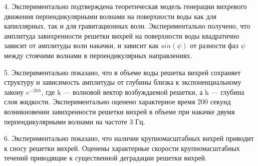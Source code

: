 4. Экспериментально подтверждена теоретическая модель генерации вихревого движения перпендикулярными волнами на поверхности воды как для капиллярных, так и для гравитационных волн. Экспериментально получено, что амплитуда завихренности решетки вихрей на поверхности воды квадратично зависит от амплитуды волн накачки, и зависит как $sin(\psi)$ от разности фаз $\psi$ между стоячими волнами в перпендикулярных направлениях. 

5. Экспериментально показано, что в объеме воды решетка вихрей сохраняет структуру и зависимость амплитуды от глубины близка к экспоненциальному закону $e^{-2kh}$, где k — волновой вектор возбуждаемой решетки, а h — глубина слоя жидкости. 
Экспериментально оценено характерное время 200 секунд возникновении завихренности решетки вихрей в объеме при накачке двумя перпендикулярными волнами на частоте 3 Гц.

6. Экспериментально показано, что наличие крупномасштабных вихрей приводит к сносу решетки вихрей. Оценены характерные скорости крупномасштабных течений приводящие к существенной деградации решетки вихрей.


